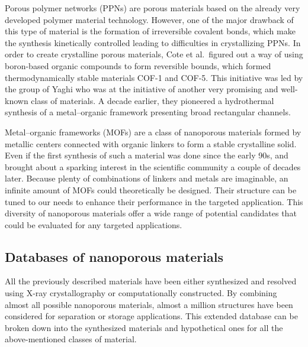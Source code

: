 \documentclass[main.tex]{subfiles}
\begin{document}
Porous polymer networks (PPNs) are porous materials based on the already very developed polymer material technology.\autocite{Lu_2010,Wang_2020,Che_2020} However, one of the major drawback of this type of material is the formation of irreversible covalent bonds, which make the synthesis kinetically controlled leading to difficulties in crystallizing PPNs.\autocite{Feng_2012} In order to create crystalline porous materials, Cote et al.\ figured out a way of using boron-based organic compounds to form reversible bounds, which formed thermodynamically stable materials COF-1 and COF-5.\autocite{Cote_2005} This initiative was led by the group of Yaghi who was at the initiative of another very promising and well-known class of materials. A decade earlier,  they pioneered a hydrothermal synthesis of a metal--organic framework presenting broad rectangular channels.\autocite{Yaghi_1995} 

Metal--organic frameworks (MOFs) are a class of nanoporous materials formed by metallic centers connected with organic linkers to form a stable crystalline solid. Even if the first synthesis of such a material was done since the early 90s,\autocite{Abrahams_1991} and brought about a sparking interest in the scientific community a couple of decades later.\autocite{Kuppler_2009,Furukawa_2013} Because plenty of combinations of linkers and metals are imaginable, an infinite amount of MOFs could theoretically be designed. Their structure can be tuned to our needs to enhance their performance in the targeted application.\autocite{Ejsmont_2021} This diversity of nanoporous materials offer a wide range of potential candidates that could be evaluated for any targeted applications. 


\subsection{Databases of nanoporous materials}

All the previously described materials have been either synthesized and resolved using X-ray crystallography or computationally constructed. By combining almost all possible nanoporous materials, almost a million structures have been considered for separation or storage applications.\autocite{Simon_2015,Simon_2015_EES,Thornton_2017} This extended database can be broken down into the synthesized materials and hypothetical ones for all the above-mentioned classes of material.
\end{document}
